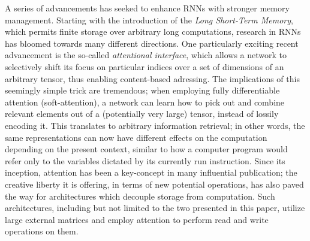 \documentclass[]{article}
\begin{document}
A series of advancements has seeked to enhance RNNs with stronger memory management. Starting with the introduction of the \textit{Long Short-Term Memory}, which permits finite storage over arbitrary long computations, research in RNNs has bloomed towards many different directions. One particularly exciting recent advancement is the so-called \textit{attentional interface}, which allows a network to selectively shift its focus on particular indices over a set of dimensions of an arbitrary tensor, thus enabling content-based adressing. The implications of this seemingly simple trick are tremendous; when employing fully differentiable attention (soft-attention), a network can learn how to pick out and combine relevant elements out of a (potentially very large) tensor, instead of lossily encoding it. This translates to arbitrary information retrieval; in other words, the same representations can now have different effects on the computation depending on the present context, similar to how a computer program would refer only to the variables dictated by its currently run instruction. Since its inception, attention has been a key-concept in many influential publication; the creative liberty it is offering, in terms of new potential operations, has also paved the way for architectures which decouple storage from computation. Such architectures, including but not limited to the two presented in this paper, utilize large external matrices and employ attention to perform read and write operations on them.
\end{document}
